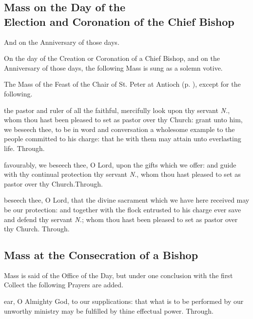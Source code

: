\subsection{Mass on the Day of the\\Election and Coronation of the Chief Bishop}
\begin{inhead}
	And on the Anniversary of those days.
\end{inhead}
\begin{rubric}
	On the day of the Creation or Coronation of a Chief Bishop, and on the Anniversary of those days, the following Mass is sung as a solemn votive.
\end{rubric}
\begin{rubric}
	The Mass of the Feast of the Chair of St. Peter at Antioch (p. \pageref{CathedraAntioch}), except for the following.
\end{rubric}

\collect
{} the pastor and ruler of all the faithful, mercifully look upon thy servant \textit{N.}, whom thou hast been pleased to set as pastor over thy Church: grant unto him, we beseech thee, to be in word and conversation a wholesome example to the people committed to his charge: that he with them may attain unto everlasting life. Through.

\secret
{} favourably, we beseech thee, O Lord, upon the gifts which we offer: and guide with thy continual protection thy servant \textit{N.}, whom thou hast pleased to set as pastor over thy Church.Through.

\postcommunion
{} beseech thee, O Lord, that the divine sacrament which we have here received may be our protection: and together with the flock entrusted to his charge ever save and defend thy servant \textit{N.}; whom thou hast been pleased to set as pastor over thy Church. Through.


\subsection{Mass at the Consecration of a Bishop}
\begin{rubric}
	Mass is said of the Office of the Day, but under one conclusion with the first Collect the following Prayers are added.
\end{rubric}

\collect
{} ear, O Almighty God, to our supplications: that what is to be performed by our unworthy ministry may be fulfilled by thine effectual power. Through.

